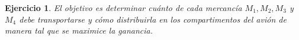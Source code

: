 \documentclass[a4paper,oneside,12pt]{amsart}
\newtheorem{quest}{Ejercicio}
\begin{document}
\begin{quest}
El objetivo es determinar cuánto de cada mercancía $M_1, M_2, M_3$ y $M_4$ debe transportarse y cómo distribuirla en los compartimentos del avión de manera tal que se maximice la ganancia. 


\end{quest}



\end{document}

